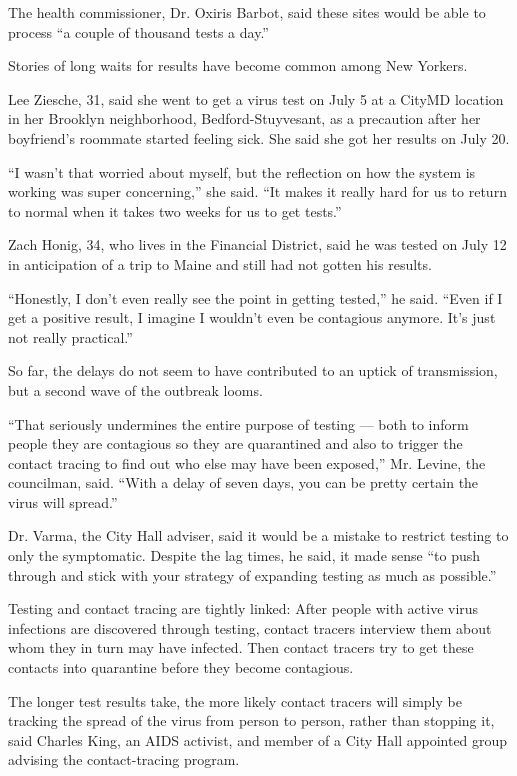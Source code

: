 The health commissioner, Dr. Oxiris Barbot, said these sites would be
able to process ``a couple of thousand tests a day.''

Stories of long waits for results have become common among New Yorkers.

Lee Ziesche, 31, said she went to get a virus test on July 5 at a CityMD
location in her Brooklyn neighborhood, Bedford-Stuyvesant, as a
precaution after her boyfriend's roommate started feeling sick. She said
she got her results on July 20.

``I wasn't that worried about myself, but the reflection on how the
system is working was super concerning,'' she said. ``It makes it really
hard for us to return to normal when it takes two weeks for us to get
tests.''

Zach Honig, 34, who lives in the Financial District, said he was tested
on July 12 in anticipation of a trip to Maine and still had not gotten
his results.

``Honestly, I don't even really see the point in getting tested,'' he
said. ``Even if I get a positive result, I imagine I wouldn't even be
contagious anymore. It's just not really practical.''

So far, the delays do not seem to have contributed to an uptick of
transmission, but a second wave of the outbreak looms.

``That seriously undermines the entire purpose of testing --- both to
inform people they are contagious so they are quarantined and also to
trigger the contact tracing to find out who else may have been
exposed,'' Mr. Levine, the councilman, said. ``With a delay of seven
days, you can be pretty certain the virus will spread.''

Dr. Varma, the City Hall adviser, said it would be a mistake to restrict
testing to only the symptomatic. Despite the lag times, he said, it made
sense ``to push through and stick with your strategy of expanding
testing as much as possible.''

Testing and contact tracing are tightly linked: After people with active
virus infections are discovered through testing, contact tracers
interview them about whom they in turn may have infected. Then contact
tracers try to get these contacts into quarantine before they become
contagious.

The longer test results take, the more likely contact tracers will
simply be tracking the spread of the virus from person to person, rather
than stopping it, said Charles King, an AIDS activist, and member of a
City Hall appointed group advising the contact-tracing program.

